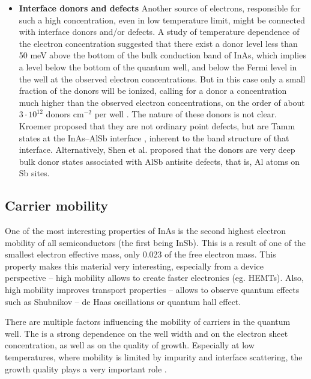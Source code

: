 \documentclass[titlepage,a4paper]{book}
\begin{document}
\begin{itemize}
\item \textbf{Interface donors and defects} \newline
Another source of electrons, responsible for such a high concentration, even in low temperature limit, might be connected with interface donors and/or defects. A study of temperature dependence of the electron concentration suggested that there exist a donor level less than 50 meV above the bottom of the bulk conduction band of InAs, which implies a level below the bottom of the quantum well, and
below the Fermi level in the well at the observed electron concentrations. But in this case only a small fraction of the donors will be ionized, calling for a donor a concentration much higher than the observed electron concentrations, on the order of about $3 \cdot 10^{12}$ donors cm$^{-2}$ per well \cite{Kroemer_review}. The nature of these donors is not clear. Kroemer proposed that they are not ordinary point defects, but are Tamm states at the InAs–AlSb interface \cite{Kroemer_TammStates}, inherent to the band structure of that interface. Alternatively, Shen et al. \cite{Shen_TammStates} proposed that the donors are very deep bulk donor states associated with AlSb antisite defects, that is, Al atoms on Sb sites.
\end{itemize}

\subsection{Carrier mobility}
One of the most interesting properties of InAs is the second highest electron mobility of all semiconductors (the first being InSb). This is a result of one of the smallest electron effective mass, only 0.023 of the free electron mass. This property makes this material very interesting, especially from a device perspective – high mobility allows to create faster electronics (eg. HEMTs). Also, high mobility improves transport properties – allows to  observe quantum effects such as Shubnikov -- de Haas oscillations or quantum hall effect.

There are multiple factors influencing the mobility of carriers in the quantum well. The is a strong dependence on the well width and on the electron sheet concentration, as well as on the quality of growth. Especially at low temperatures, where mobility is limited by impurity and interface scattering, the growth quality plays a very important role \cite{Nguyen_Mobility}.
\end{document}
